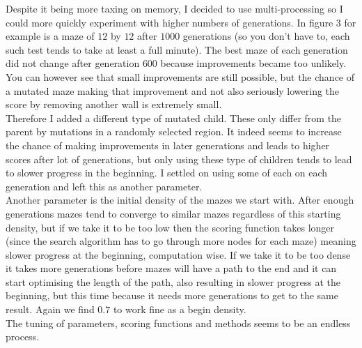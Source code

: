 \documentclass[10pt, a4paper, twoside]{amsart}
\newcommand{\1}{\mathbbm{1}}
\begin{document}
Despite it being more taxing on memory, I decided to use multi-processing so I could more quickly experiment with higher numbers of generations. In figure 3 for example is a maze of $12$ by $12$ after $1000$ generations (so you don't have to, each such test tends to take at least a full minute). The best maze of each generation did not change after generation $600$ because improvements became too unlikely. You can however see that small improvements are still possible, but the chance of a mutated maze making that improvement and not also seriously lowering the score by removing another wall is extremely small.\\

Therefore I added a different type of mutated child. These only differ from the parent by mutations in a randomly selected region. It indeed seems to increase the chance of making improvements in later generations and leads to higher scores after lot of generations, but only using these type of children tends to lead to slower progress in the beginning. I settled on using some of each on each generation and left this as another parameter.\\

Another parameter is the initial density of the mazes we start with. After enough generations mazes tend to converge to similar mazes regardless of this starting density, but if we take it to be too low then the scoring function takes longer (since the search algorithm has to go through more nodes for each maze) meaning slower progress at the beginning, computation wise. If we take it to be too dense it takes more generations before mazes will have a path to the end and it can start optimising the length of the path, also resulting in slower progress at the beginning, but this time because it needs more generations to get to the same result. Again we find $0.7$ to work fine as a begin density.\\

The tuning of parameters, scoring functions and methods seems to be an endless process.
\end{document}
